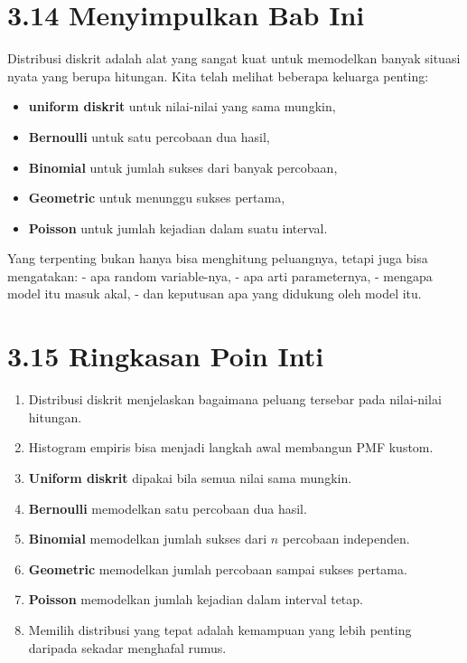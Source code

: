 \documentclass[
  letterpaper,
  DIV=11,
  numbers=noendperiod]{scrreprt}
\providecommand{\tightlist}{%
  \setlength{\itemsep}{0pt}\setlength{\parskip}{0pt}}
\begin{document}
\section{3.14 Menyimpulkan Bab Ini}\label{menyimpulkan-bab-ini-2}

Distribusi diskrit adalah alat yang sangat kuat untuk memodelkan banyak
situasi nyata yang berupa hitungan. Kita telah melihat beberapa keluarga
penting:

\begin{itemize}
\tightlist
\item
  \textbf{uniform diskrit} untuk nilai-nilai yang sama mungkin,
\item
  \textbf{Bernoulli} untuk satu percobaan dua hasil,
\item
  \textbf{Binomial} untuk jumlah sukses dari banyak percobaan,
\item
  \textbf{Geometric} untuk menunggu sukses pertama,
\item
  \textbf{Poisson} untuk jumlah kejadian dalam suatu interval.
\end{itemize}

Yang terpenting bukan hanya bisa menghitung peluangnya, tetapi juga bisa
mengatakan: - apa random variable-nya, - apa arti parameternya, -
mengapa model itu masuk akal, - dan keputusan apa yang didukung oleh
model itu.

\section{3.15 Ringkasan Poin Inti}\label{ringkasan-poin-inti-2}

\begin{enumerate}
\def\labelenumi{\arabic{enumi}.}
\tightlist
\item
  Distribusi diskrit menjelaskan bagaimana peluang tersebar pada
  nilai-nilai hitungan.
\item
  Histogram empiris bisa menjadi langkah awal membangun PMF kustom.
\item
  \textbf{Uniform diskrit} dipakai bila semua nilai sama mungkin.
\item
  \textbf{Bernoulli} memodelkan satu percobaan dua hasil.
\item
  \textbf{Binomial} memodelkan jumlah sukses dari \(n\) percobaan
  independen.
\item
  \textbf{Geometric} memodelkan jumlah percobaan sampai sukses pertama.
\item
  \textbf{Poisson} memodelkan jumlah kejadian dalam interval tetap.
\item
  Memilih distribusi yang tepat adalah kemampuan yang lebih penting
  daripada sekadar menghafal rumus.
\end{enumerate}
\end{document}
